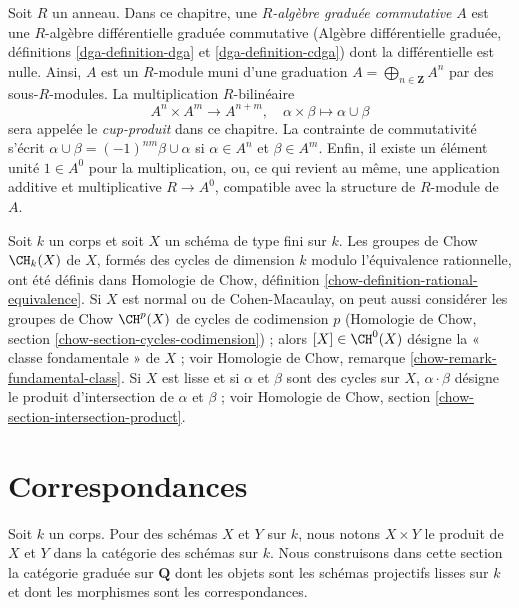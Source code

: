 \medskip\noindent
Soit $R$ un anneau. Dans ce chapitre, une
{\it $R$-algèbre graduée commutative} $A$ est une
$R$-algèbre différentielle graduée commutative
(Algèbre différentielle graduée, définitions \ref{dga-definition-dga} et
\ref{dga-definition-cdga}) dont la différentielle est nulle. Ainsi, $A$
est un $R$-module muni d'une graduation
$A = \bigoplus_{n \in \mathbf{Z}} A^n$ par des
sous-$R$-modules. La multiplication $R$-bilinéaire
$$
A^n \times A^m \longrightarrow A^{n + m},\quad
\alpha \times \beta \longmapsto \alpha \cup \beta
$$
sera appelée le {\it cup-produit} dans ce chapitre.
La contrainte de commutativité s'écrit
$\alpha \cup \beta = (-1)^{nm} \beta \cup \alpha$ si
$\alpha \in A^n$ et $\beta \in A^m$. Enfin, il existe
un élément unité $1 \in A^0$ pour la multiplication, ou, ce qui revient au même,
une application additive et multiplicative $R \to A^0$, compatible avec
la structure de $R$-module de $A$.

\medskip\noindent
Soit $k$ un corps et soit $X$ un schéma de type fini sur $k$.
Les groupes de Chow $\CH_k(X)$ de $X$, formés des cycles de dimension $k$
modulo l'équivalence rationnelle, ont été définis dans
Homologie de Chow, définition \ref{chow-definition-rational-equivalence}.
Si $X$ est normal ou de Cohen-Macaulay, on peut aussi considérer
les groupes de Chow $\CH^p(X)$ de cycles de codimension $p$
(Homologie de Chow, section \ref{chow-section-cycles-codimension}) ;
alors $[X] \in \CH^0(X)$ désigne la « classe fondamentale » de $X$ ; voir
Homologie de Chow, remarque \ref{chow-remark-fundamental-class}.
Si $X$ est lisse et si $\alpha$ et $\beta$ sont des cycles sur $X$,
$\alpha \cdot \beta$ désigne le produit d'intersection de
$\alpha$ et $\beta$ ; voir
Homologie de Chow, section \ref{chow-section-intersection-product}.













\section{Correspondances}
\label{section-correspondences}

\noindent
Soit $k$ un corps. Pour des schémas $X$ et $Y$ sur $k$, nous notons
$X \times Y$ le produit de $X$ et $Y$ dans la catégorie des schémas
sur $k$. Nous construisons dans cette section la catégorie graduée sur
$\mathbf{Q}$ dont les objets sont les schémas projectifs lisses sur $k$ et dont
les morphismes sont les correspondances.

